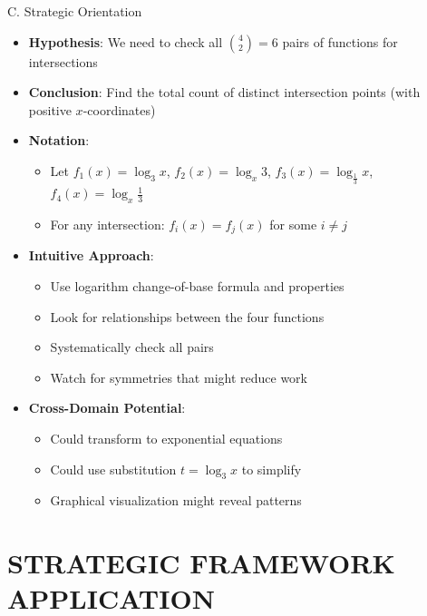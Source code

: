 \documentclass[12pt]{article}
\begin{document}
\begin{problemconfigbox}{C. Strategic Orientation}
\begin{itemize}[leftmargin=*]
    \item \textbf{Hypothesis}: We need to check all $\binom{4}{2} = 6$ pairs of functions for intersections
    
    \item \textbf{Conclusion}: Find the total count of distinct intersection points (with positive $x$-coordinates)
    
    \item \textbf{Notation}: 
    \begin{itemize}
        \item Let $f_1(x) = \log_3 x$, $f_2(x) = \log_x 3$, $f_3(x) = \log_{\frac{1}{3}} x$, $f_4(x) = \log_x \frac{1}{3}$
        \item For any intersection: $f_i(x) = f_j(x)$ for some $i \neq j$
    \end{itemize}
    
    \item \textbf{Intuitive Approach}: 
    \begin{itemize}
        \item Use logarithm change-of-base formula and properties
        \item Look for relationships between the four functions
        \item Systematically check all pairs
        \item Watch for symmetries that might reduce work
    \end{itemize}
    
    \item \textbf{Cross-Domain Potential}: 
    \begin{itemize}
        \item Could transform to exponential equations
        \item Could use substitution $t = \log_3 x$ to simplify
        \item Graphical visualization might reveal patterns
    \end{itemize}
\end{itemize}
\end{problemconfigbox}

\section{STRATEGIC FRAMEWORK APPLICATION}
\end{document}
